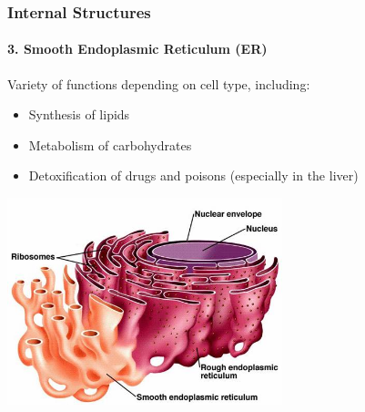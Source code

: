 \documentclass[10pt]{beamer}
\begin{document}
\begin{frame}[t]
\frametitle{Internal Structures}
\framesubtitle{3. Smooth Endoplasmic Reticulum (ER)}
\vspace{0.5cm}

	Variety of functions depending on cell type, including:
		\medskip
		\begin{itemize}
			\item Synthesis of lipids
			\medskip
			\item Metabolism of carbohydrates
			\medskip
			\item Detoxification of drugs and poisons (especially in the liver)
		\end{itemize}
	
	\vspace{0.2cm}
	
	\begin{center}
		\includegraphics[width=0.6\textwidth]{figures/roughER.jpg}
	\end{center}

\end{frame}
\end{document}
